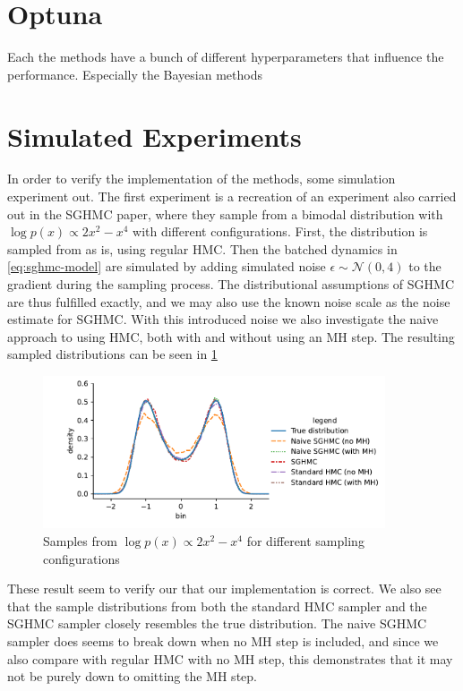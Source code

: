 \section{Optuna}

Each the methods have a bunch of different hyperparameters that influence the performance.
Especially the Bayesian methods   


\section{Simulated Experiments}

In order to verify the implementation of the methods, some simulation experiment out. 
The first experiment is a recreation of an experiment also carried out in the SGHMC paper, where they sample from a bimodal distribution with $\log p(x) \propto 2 x^2 - x^ 4$ with different configurations. 
First, the distribution is sampled from as is, using regular HMC.
Then the batched dynamics in \cref{eq:sghmc-model} are simulated by adding simulated noise $\epsilon \sim \mathcal{N}(0, 4)$ to the gradient during the sampling process. 
The distributional assumptions of SGHMC are thus fulfilled exactly, and we may also use the known noise scale as the noise estimate for SGHMC. 
With this introduced noise we also investigate the naive approach to using HMC, both with and without using an MH step. 
The resulting sampled distributions can be seen in \cref{fig:synthetic}
\begin{figure}[htb]
    \centering
    \includegraphics[width=0.9\textwidth]{Figures/synthetic.pdf}
    \caption{Samples from $\log p(x) \propto 2 x^2 - x^ 4$ for different sampling configurations}
    \label{fig:synthetic}
\end{figure}
These result seem to verify our that our implementation is correct.
We also see that the sample distributions from both the standard HMC sampler and the SGHMC sampler closely resembles the true distribution. 
The naive SGHMC sampler does seems to break down when no MH step is included, and since we also compare with regular HMC with no MH step, this demonstrates that it may not be purely down to omitting the MH step. 

